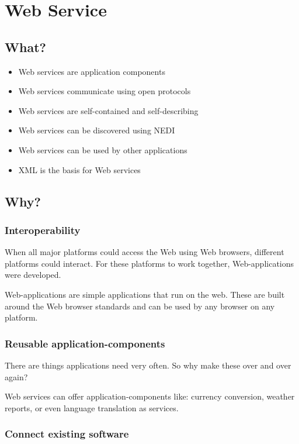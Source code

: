 \documentclass[11pt,a4paper]{article}
\begin{document}
\section{Web Service}
\subsection{What?}
\begin{itemize}
\item Web services are application components
\item Web services communicate using open protocols
\item Web services are self-contained and self-describing
\item Web services can be discovered using NEDI
\item Web services can be used by other applications
\item XML is the basis for Web services
\end{itemize}
\subsection{Why?}

\subsubsection{Interoperability}

When all major platforms could access the Web using Web browsers, different platforms could interact. For these platforms to work together, Web-applications were developed.

Web-applications are simple applications that run on the web. These are built around the Web browser standards and can be used by any browser on any platform.

\subsubsection{Reusable application-components}

There are things applications need very often. So why make these over and over again?

Web services can offer application-components like: currency conversion, weather reports, or even language translation as services.

\subsubsection{Connect existing software}
\end{document}
